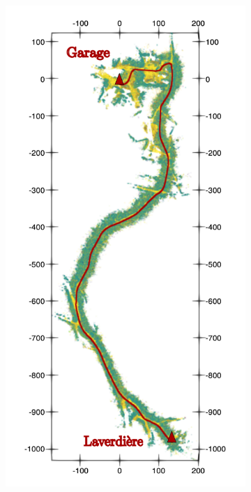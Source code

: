 \begin{figure}[h!]
	\begin{center}
		\begin{subfigure}[b]{0.32\textwidth}
			\includegraphics[width=\linewidth]{figs/ltr_map_traj/path_a.pdf}

\end{subfigure}
\end{center}
\end{figure}

